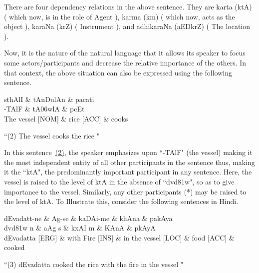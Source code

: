 \documentclass[twoside]{article}
\begin{document}
There are four dependency relations in the above sentence. They are karta ({\dn ktA\0}) ( which now, is in the role of Agent ), karma ({\dn km\0}) ( which now, acts as the object ), karaNa ({\dn krZ}) ( Instrument ), and adhikaraNa ({\dn aEDkrZ}) ( The location ).

Now, it is the nature of the natural language that it allows its speaker to focus some actors/participants and decrease the relative importance of the others. In that context, the above situation can also be expressed using the following sentence.

\hypertarget{fig2}{}
\begin{center}
\begin{dependency}[arc edge, arc angle=80, text only label, label style={above}]
   \begin{deptext}[column sep=1em]
      sthAlI \& tAnDulAn \& pacati \\
      {\dn -TAlF} \& {\dn tA\306wlA} \& {\dn pcEt} \\      
      The vessel [NOM] \& rice [ACC]  \& cooks \\
   \end{deptext}
   
\end{dependency} 

 ``(2) The vessel cooks the rice " 
\end{center}
In this sentence~\hyperlink{fig2}{(2)}, the speaker emphasizes upon ``{\dn -TAlF}" (the vessel) making it the most independent entity of all other participants in the sentence thus, making it the ``{\dn ktA\0}", the predominantly important participant in any sentence.
Here, the vessel is raised to the level of {\dn ktA\0} in the absence of ``{\dn d\?vd\381w}", so as to give importance to the vessel.
Similarly, any other participants (*) may be raised to the level of {\dn ktA\0}.
To Illustrate this, consider the following sentences in Hindi.

\hypertarget{fig3}{}
\begin{center}
\begin{dependency}[arc edge, arc angle=80, text only label, label style={above}]
   \begin{deptext}[column sep=1em]
      dEvadatt-ne \& Ag-se \& kaDAi-me \& khAna \& pakAya \\
      {\dn d\?vd\381w n\?} \& {\dn aAg s\?} \& {\dn kxAI m\?{\qva}} \& {\dn KAnA} \& {\dn pkAyA} \\      
      dEvadatta [ERG] \& with Fire [INS] \& in the vessel [LOC] \& food [ACC]  \& cooked \\
   \end{deptext}
\end{dependency} 

 ``(3) dEvadatta cooked the rice with the fire in the vessel " 
 

\end{center}
\end{document}
